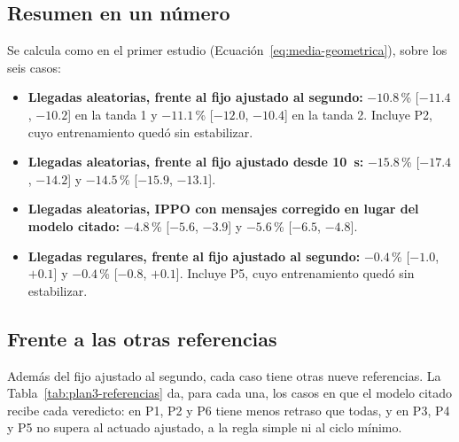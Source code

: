 \subsection*{Resumen en un número}

Se calcula como en el primer estudio
(Ecuación~\ref{eq:media-geometrica}), sobre los seis casos:
\begin{itemize}
  \item \textbf{Llegadas aleatorias, frente al fijo ajustado al
    segundo:} $-10.8$\,\% [$-11.4$, $-10.2$] en la tanda 1 y
    $-11.1$\,\% [$-12.0$, $-10.4$] en la tanda 2. Incluye P2, cuyo
    entrenamiento quedó sin estabilizar.
  \item \textbf{Llegadas aleatorias, frente al fijo ajustado desde
    10~s:} $-15.8$\,\% [$-17.4$, $-14.2$] y $-14.5$\,\% [$-15.9$,
    $-13.1$].
  \item \textbf{Llegadas aleatorias, IPPO con mensajes corregido en
    lugar del modelo citado:} $-4.8$\,\% [$-5.6$, $-3.9$] y
    $-5.6$\,\% [$-6.5$, $-4.8$].
  \item \textbf{Llegadas regulares, frente al fijo ajustado al
    segundo:} $-0.4$\,\% [$-1.0$, $+0.1$] y $-0.4$\,\% [$-0.8$,
    $+0.1$]. Incluye P5, cuyo entrenamiento quedó sin estabilizar.
\end{itemize}

\subsection*{Frente a las otras referencias}

Además del fijo ajustado al segundo, cada caso tiene otras nueve
referencias. La Tabla~\ref{tab:plan3-referencias} da, para cada una, los
casos en que el modelo citado recibe cada veredicto: en P1, P2 y P6
tiene menos retraso que todas, y en P3, P4 y P5 no supera al actuado
ajustado, a la regla simple ni al ciclo mínimo.

\begin{table}[H]
\centering
\footnotesize
\setlength{\tabcolsep}{3pt}

\caption[Segundo estudio: el modelo citado frente a las otras referencias]{Casos en que el modelo citado recibe cada veredicto frente a cada una de las otras referencias, con llegadas aleatorias: la misma regla, con esa referencia en el lugar del fijo. Actuado por defecto: el actuado del plan. Fijo ajustado desde 10~s: el del Anexo~F. Fijo de verdes de 5 en 5: el mejor fijo con verdes múltiplos de 5~s. Fijo por franja: un plan fijo por cada media hora. Regla simple: ciclo mínimo, y alarga el verde de la avenida si hay cola. Regla reactiva: alarga el verde mientras llegan vehículos. (a) La mejora aparece en una sola tanda.}
\label{tab:plan3-referencias}
\end{table}

